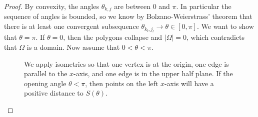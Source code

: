 \documentclass{amsart}
\theoremstyle{definition}
\begin{document}
\begin{proof} By convexity, the angles $\theta_{k,j}$ are between 0 and $\pi$. In particular the sequence of angles is bounded, so we know by Bolzano-Weierstrass' theorem that there is at least one convergent subsequence $\theta_{k_l,j_l} \to \theta \in [0,\pi]$. We want to show that $\theta = \pi$. If $\theta = 0$, then the polygons collapse and $|\Omega| = 0$, which contradicts that $\Omega$ is a domain. Now assume that $0 < \theta < \pi$.
\begin{figure}[hbt!] 
\centering
{}
\caption{We apply isometries so that one vertex is at the origin, one edge is parallel to the $x$-axis, and one edge is in the upper half plane. If the opening angle $\theta < \pi$, then points on the left $x$-axis will have a positive distance to $S(\theta)$.} 
\label{fig:polygons_sector_angle}
\end{figure}


\end{proof}
\end{document}
